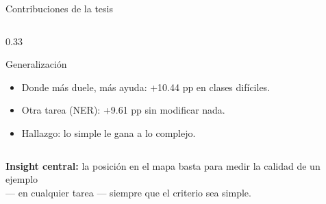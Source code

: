 \begin{frame}{Contribuciones de la tesis}
\begin{columns}[T]
\begin{column}{0.33\textwidth}
\begin{block}{Generalización}
\scriptsize
\begin{itemize}\setlength\itemsep{0pt}
  \item Donde más duele, más ayuda: +10.44 pp en clases difíciles.
  \item Otra tarea (NER): +9.61 pp sin modificar nada.
  \item Hallazgo: lo simple le gana a lo complejo.
\end{itemize}
\end{block}
\end{column}

\end{columns}

\vspace{0.5em}
\begin{insight}
\scriptsize\centering
\textbf{Insight central:} la posición en el mapa basta para medir la calidad de un ejemplo\\
— en cualquier tarea — siempre que el criterio sea simple.
\end{insight}
\end{frame}
\fi

